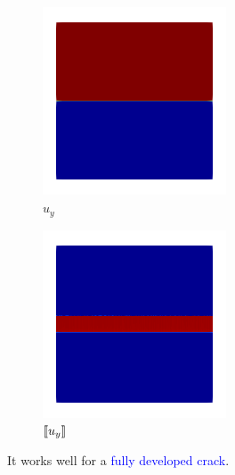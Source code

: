 \begin{frame}
{\begin{figure}
\begin{subfigure}{0.32\textwidth}
            \end{subfigure}
            \begin{subfigure}{0.32\textwidth}
                \centering
                \caption*{$u_y$}
                \includegraphics[width=0.6\textwidth]{method/figures/uy_1.png}
            \end{subfigure}
            \begin{subfigure}{0.32\textwidth}
                \centering
                \caption*{$\left\llbracket u_y\right\rrbracket$}
                \includegraphics[width=0.6\textwidth]{method/figures/w_1.png}
            \end{subfigure}
            \caption*{It works well for a \textcolor{blue}{fully developed crack}.}
        \end{figure}
    }
\end{frame}
